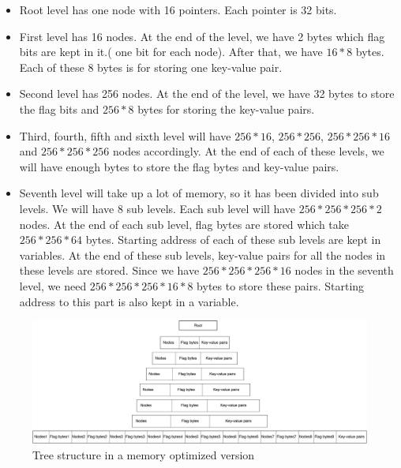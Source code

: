 \documentclass[12pt]{report}
\begin{document}
\begin{itemize}
\item Root level has one node with 16 pointers. Each pointer is 32 bits.   
 \item First level has 16 nodes. At the end of the level, we have 2 bytes which flag bits are kept in it.( one bit for each node). After that, we have $16*8$ bytes. Each of these 8 bytes is for storing one key-value pair. 
 \item Second level has 256 nodes. At the end of the level, we have 32 bytes to store the flag bits and $256*8$ bytes for storing the key-value pairs. 
 \item Third, fourth, fifth and sixth level will have $256*16$, $256*256$, $256*256*16$ and $256*256*256$ nodes accordingly. At the end of each of these levels, we will have enough bytes to store the flag bytes and key-value pairs.
 \item Seventh level will take up a lot of memory, so it has been divided into sub levels. We will have 8 sub levels. Each sub level will have $256*256*256*2$ nodes. At the end of each sub level, flag bytes are stored which take $256*256*64$ bytes. Starting address of each of these sub levels are kept in variables. At the end of these sub levels, key-value pairs for all the nodes in these levels are stored. Since we have $256*256*256*16$ nodes in the seventh level, we need $256*256*256*16*8$ bytes to store these pairs. Starting address to this part is also kept in a variable.
\end{itemize}

\begin{figure}[h]
\includegraphics[scale=0.09]{treestructure3}
\caption{ Tree structure in a memory optimized version}
\centering

\end{figure}
\end{document}
